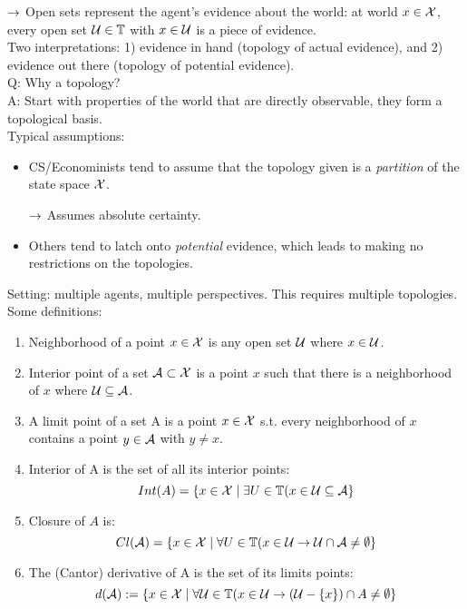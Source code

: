 $\rightarrow$ Open sets represent the agent's evidence about the world: at world $x \in \mathcal{X}$, every open set $\mathcal{U} \in \mathbb{T}$ with $x \in \mathcal{U}$ is a piece of evidence. \\

Two interpretations: 1) evidence in hand (topology of actual evidence), and 2) evidence out there (topology of potential evidence). \\

Q: Why a topology? \\

A: Start with properties of the world that are directly observable, they form a topological basis. \\

Typical assumptions:
\begin{itemize}
    \item CS/Econominists tend to assume that the topology given is a {\it partition} of the state space $\mathcal{X}$.
    
    $\rightarrow$ Assumes absolute certainty.
    
    \item Others tend to latch onto {\it potential} evidence, which leads to making no restrictions on the topologies.
\end{itemize}

Setting: multiple agents, multiple perspectives. This requires multiple topologies. \\

Some definitions:
\begin{enumerate}
    \item Neighborhood of a point $x \in \mathcal{X}$ is  any open set $\mathcal{U}$ where $x \in \mathcal{U}$.
    \item Interior point of a set $\mathcal{A} \subset \mathcal{X}$ is a point $x$ such that there is a neighborhood of $x$ where $\mathcal{U} \subseteq \mathcal{A}$.
    \item A limit point of a set A is a point $x \in \mathcal{X}$ s.t. every neighborhood of $x$ contains a point $y \in \mathcal{A}$ with $y \neq x$.
    \item Interior of A is the set of all its interior points:
    \[
    Int(A) = \{x \in \mathcal{X} \mid \exists U \in \mathbb{T}(x \in \mathcal{U} \subseteq \mathcal{A}\}
    \]
    \item Closure of $A$ is:
    \[
    Cl(\mathcal{A}) = \{x \in \mathcal{X} \mid \forall U \in \mathbb{T}(x \in \mathcal{U} \rightarrow \mathcal{U} \cap \mathcal{A} \neq \emptyset\}
    \]
    \item The (Cantor) derivative of A is the set of its limits points:
    \[
    d(\mathcal{A}) := \{x \in \mathcal{X} \mid \forall \mathcal{U} \in \mathbb{T}(x \in \mathcal{U} \rightarrow (\mathcal{U} - \{x\})\cap A \neq \emptyset\}
    \]
\end{enumerate}

